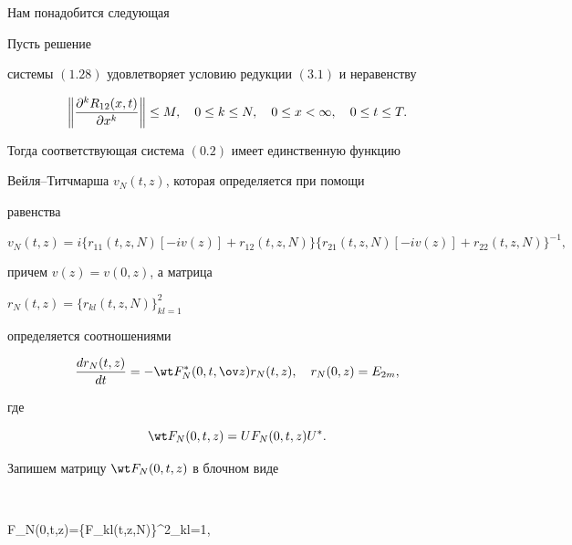 Нам понадобится следующая 


 


\begin{thms} Пусть решение 


системы $(1.28)$ удовлетворяет условию редукции $(3.1)$ и неравенству 


$$ 


\bigg\|\myfrac{^k R_{12}(x,t)}{x^k}\bigg\|\le M,\quad 


0\le k\le N,\quad 0\le x<\infty,\quad 0\le t\le T. 


$$ 


Тогда соответствующая система $(0.2)$ имеет единственную функцию 


Вейля--Титчмарша $v_N(t,z)$, которая определяется при помощи 


равенства 


\begin{equation} 


v_N(t,z)=i\{r_{11}(t,z,N)[-iv(z)]+r_{12}(t,z,N)\} 


\{r_{21}(t,z,N)[-iv(z)]+r_{22}(t,z,N)\}^{-1}, 


\end{equation} 


причем $v(z)=v(0,z)$, а матрица 


$r_N(t,z)=\{r_{kl}(t,z,N)\}^2_{kl=1}$ 


определяется соотношениями 


\begin{equation} 


\frac{d r_N(t,z)}{dt}=-\wt F^*_N(0,t,\ov z) 


r_N(t,z),\quad r_N(0,z)=E_{2m}, 


\end{equation} 


где 


\begin{equation} 


\wt F_N(0,t,z)=U F_N(0,t,z)U^*. 


\end{equation} 


\end{thms} 


 


Запишем матрицу $\wt F_N(0,t,z)$ в блочном виде 


$$ 


\wt F_N(0,t,z)=\{\wt F_{kl}(t,z,N)\}^2_{kl=1}, 


